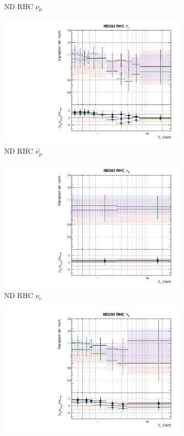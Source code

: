 \begin{figure}
\begin{subfigure}{0.24\textwidth}
  \caption{ND RHC $\nu_{\mu}$}
\end{subfigure}
\begin{subfigure}{0.24\textwidth}
  \centering
  \includegraphics[width=0.95\linewidth]{figs/fhcrhcfitsflux_5}
  \caption{ND RHC $\bar{\nu_{\mu}}$}
\end{subfigure}
\begin{subfigure}{0.24\textwidth}
  \centering
  \includegraphics[width=0.95\linewidth]{figs/fhcrhcfitsflux_6}
  \caption{ND RHC $\nu_e$}
\end{subfigure}
\vspace{15mm}
\begin{subfigure}{0.24\textwidth}
  \centering
  \includegraphics[width=0.95\linewidth]{figs/fhcrhcfitsflux_7}

\end{subfigure}
\end{figure}
